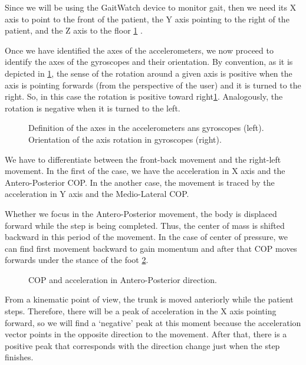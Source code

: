 Since we will be using the GaitWatch device to monitor gait, then we need its X axis to point to the front of the patient, the Y axis pointing to the right  of the patient, and the Z axis to the floor \ref{fig:axesGW} \cite{OlivaresBotzel2013}.

Once we have identified the axes of the accelerometers, we now proceed to identify the axes of the gyroscopes and their orientation. By convention, as it is depicted in \ref{fig:axesGW}, the sense of the rotation around a given axis is positive when the axis is pointing forwards (from the perspective of the user) and it is turned to the right. So, in this case the rotation is positive toward right\ref{fig:axesGW}. Analogously, the rotation is negative when it is turned to the left.

\begin{figure}[H]
	\centering
	\caption{Definition of the axes in the accelerometers ans gyroscopes (left). Orientation of the axis rotation in gyroscopes (right).}
	\label{fig:axesGW}
\end{figure}

We have to differentiate between the front-back movement and the right-left movement. In the first of the case, we have the acceleration in X axis and the Antero-Posterior COP. In the another case, the movement is traced by the acceleration in Y axis and the Medio-Lateral  COP.




Whether we focus in the Antero-Posterior movement, the body is displaced forward while the step is being completed. Thus, the center of mass is shifted backward in this period of the movement. In the case of center of pressure, we can find first  movement backward to gain momentum and after that  COP moves forwards under the stance of the foot \ref{fig:AP_AccX}.



\begin{figure}[H]
	\centering
	\caption{COP and acceleration in Antero-Posterior direction.}
	\label{fig:AP_AccX}
\end{figure}

From a kinematic point of view, the trunk is moved anteriorly while the patient steps. Therefore, there will be a peak of acceleration in the X axis pointing forward, so we will find a ‘negative’ peak at this moment because the acceleration vector points in the opposite direction to the movement. After that, there is a positive peak that corresponds with the direction change just when the step finishes. 

